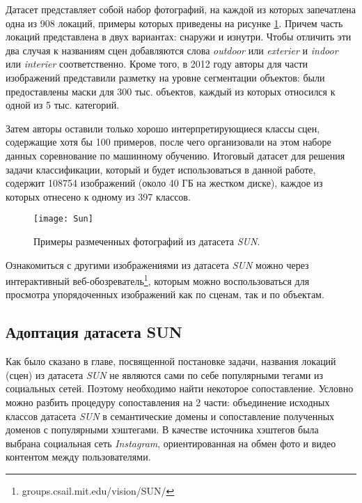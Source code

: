 \indent
\indent
Датасет представляет собой набор фотографий, на каждой из которых запечатлена
одна из 908 локаций, примеры которых приведены на рисунке \ref{tikzpicture: sun}. Причем
часть локаций представлена в двух
вариантах: снаружи и изнутри. Чтобы отличить эти 
два случая к названиям сцен добавляются слова \textit{outdoor} или \textit{exterier} и \textit{indoor} или \textit{interier} соответственно.
Кроме того, в 2012 году авторы для части изображений представили разметку 
на уровне сегментации объектов: были предоставлены маски для 300 тыс. объектов, каждый из которых относился к одной из 5 тыс. категорий.

\indent
\indent
Затем авторы оставили только хорошо интерпретирующиеся классы сцен, 
содержащие хотя бы 100 примеров, после чего организовали на этом
наборе данных соревнование по машинному обучению. Итоговый датасет
для решения задачи классификации,
который и будет использоваться в данной работе,
содержит 108754 изображений (около 40 ГБ на жестком диске), каждое 
из которых отнесено к одному из 397 классов.

\begin{figure}[h]
    \begin{center}
   	    \texttt{[image: Sun]}
   	\end{center}
   	\caption{Примеры размеченных фотографий из датасета \textit{SUN}.}
   	\label{tikzpicture: sun}
\end{figure}

Ознакомиться с другими изображениями из датасета \textit{SUN} можно через 
интерактивный веб-обозреватель\footnote{groups.csail.mit.edu/vision/SUN/}, которым
можно воспользоваться для просмотра упорядоченных изображений как 
по сценам, так и по объектам.


\subsection{Адоптация датасета SUN}

\indent
\indent
Как было сказано в главе, посвященной постановке задачи,
 названия локаций (сцен) из датасета \textit{SUN} не 
являются сами по себе популярными тегами из социальных сетей. Поэтому 
необходимо найти некоторое сопоставление. Условно можно
разбить процедуру сопоставления на 2 части: объединение исходных классов 
датасета \textit{SUN} в семантические домены и сопоставление полученных доменов
с популярными хэштегами. В качестве источника хэштегов была выбрана социальная
сеть \textit{Instagram}, ориентированная на обмен фото
и видео контентом между пользователями.

